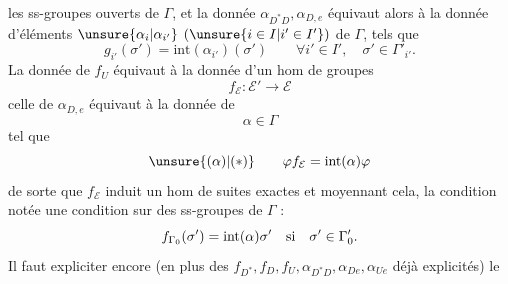 

les ss-groupes ouverts de $\Gamma$,
et la donnée 
 $\alpha_{D^*D},\alpha_{D,e}$ équivaut alors
à la donnée d'éléments $\unsure{\alpha_i|\alpha_{i'}}$
$(\unsure{i\in I|i'\in I'})$ de $\Gamma$,
tels que
\[
g_{i'}(\sigma')=\mathrm{int}(\alpha_{i'})(\sigma')
\qquad\forall i'\in I',\quad\sigma'\in\Gamma'_{i'}.
\]
La donnée de $f_U$ équivaut à la donnée d'un hom de groupes
\[
\boxed{f_{\mathcal E}:\mathcal E'\to\mathcal E}
\]
celle de $\alpha_{D,e}$ équivaut à la donnée de
\[
\boxed{\alpha\in\Gamma}
\]
tel que
\[
\unsure{(\alpha)|(*)}\qquad
\varphi f_{\mathcal E}=\mathrm{int}(\alpha)\varphi
\]
de sorte que $f_{\mathcal E}$ induit un hom de suites exactes
et moyennant cela, la condition notée \unsure{$(\alpha)$|$(*)$}
 une condition sur des
 ss-groupes de $\Gamma$ :
\[
f_{\Gamma_0}(\sigma')=\mathrm{int}(\alpha)\sigma'
\quad\hbox{si}\quad\sigma'\in\Gamma'_0.
\]
Il faut expliciter encore (en plus des
$f_{D^*},f_D,f_U,\alpha_{D^*D},\alpha_{De},\alpha_{Ue}$
déjà explicités) le
